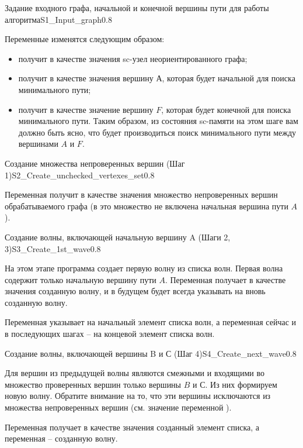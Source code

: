 \begin{algostep}{Задание входного графа, начальной и конечной вершины
    пути для работы алгоритма}{S1_Input_graph}{0.8}
  
  Переменные изменятся следующим образом:

  \begin{itemize}
  \item {} получит в качестве значения sc-узел
    неориентированного графа;
  \item {} получит в качестве
    значения вершину А, которая будет начальной для поиска минимального
    пути;
  \item {} получит в качестве значение вершину $F$,
    которая будет конечной для поиска минимального пути.  Таким образом,
    из состояния sc-памяти на этом шаге вам должно быть ясно, что будет
    производиться поиск минимального пути между вершинами $A$ и $F$.
  \end{itemize}
\end{algostep}


\begin{algostep}{Создание множества непроверенных вершин (Шаг
    1)}{S2_Create_unchecked_vertexes_set}{0.8}

  Переменная  получит в качестве значения
  множество непроверенных вершин обрабатываемого графа (в это множество
  не включена начальная вершина пути $A$).
\end{algostep}


\begin{algostep}{Создание волны, включающей начальную вершину A (Шаги
    2, 3)}{S3_Create_1st_wave}{0.8}

  На этом этапе программа создает первую волну из списка волн. Первая
  волна содержит только начальную вершину пути $A$. Переменная
   получает в качестве значения созданную волну, и в
  будущем будет всегда указывать на вновь созданную волну.

  Переменная  указывает на начальный элемент
  списка волн, а переменная  сейчас и в
  последующих шагах – на концевой элемент списка волн.
\end{algostep}


\begin{algostep}{Создание волны, включающей вершины B и С (Шаг
    4)}{S4_Create_next_wave}{0.8}
  
  Для вершин из предыдущей волны являются смежными и входящими во
  множество проверенных вершин только вершины $B$ и $С$. Из них
  формируем новую волну. Обратите внимание на то, что эти вершины
  исключаются из множества непроверенных вершин (см. значение
  переменной ).

  Переменная  получает в качестве значения
  созданный элемент списка, а переменная  – созданную
  волну.
\end{algostep}


